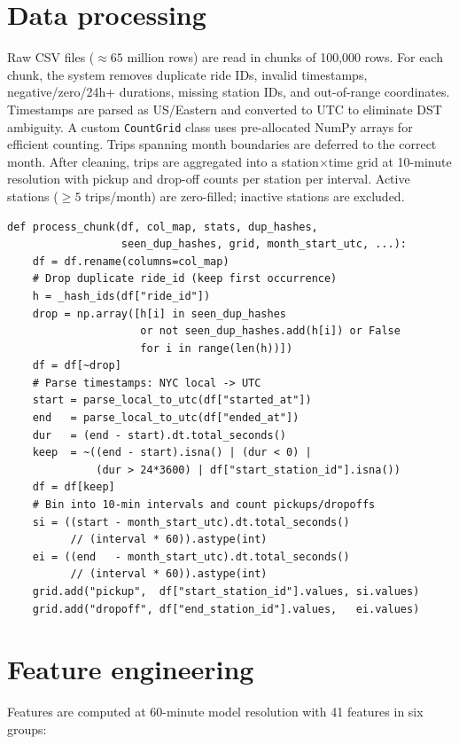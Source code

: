 \documentclass[12pt,a4paper]{report}
\begin{document}
\section{Data processing}

Raw CSV files ($\approx 65$ million rows) are read in chunks of
100{,}000 rows. For each chunk, the system removes duplicate ride
IDs, invalid timestamps, negative/zero/24h+ durations, missing
station IDs, and out-of-range coordinates. Timestamps are parsed as
US/Eastern and converted to UTC to eliminate DST ambiguity. A custom
\texttt{CountGrid} class uses pre-allocated NumPy arrays for efficient
counting. Trips spanning month boundaries are deferred to the correct
month. After cleaning, trips are aggregated into a
station$\times$time grid at 10-minute resolution with pickup and
drop-off counts per station per interval. Active stations
($\geq 5$ trips/month) are zero-filled; inactive stations are
excluded.

\begin{lstlisting}[caption={Data cleaning and aggregation
(chunk processing, \texttt{preprocess.py})},label={lst:clean}]
def process_chunk(df, col_map, stats, dup_hashes,
                  seen_dup_hashes, grid, month_start_utc, ...):
    df = df.rename(columns=col_map)
    # Drop duplicate ride_id (keep first occurrence)
    h = _hash_ids(df["ride_id"])
    drop = np.array([h[i] in seen_dup_hashes
                     or not seen_dup_hashes.add(h[i]) or False
                     for i in range(len(h))])
    df = df[~drop]
    # Parse timestamps: NYC local -> UTC
    start = parse_local_to_utc(df["started_at"])
    end   = parse_local_to_utc(df["ended_at"])
    dur   = (end - start).dt.total_seconds()
    keep  = ~((end - start).isna() | (dur < 0) |
              (dur > 24*3600) | df["start_station_id"].isna())
    df = df[keep]
    # Bin into 10-min intervals and count pickups/dropoffs
    si = ((start - month_start_utc).dt.total_seconds()
          // (interval * 60)).astype(int)
    ei = ((end   - month_start_utc).dt.total_seconds()
          // (interval * 60)).astype(int)
    grid.add("pickup",  df["start_station_id"].values, si.values)
    grid.add("dropoff", df["end_station_id"].values,   ei.values)
\end{lstlisting}

\section{Feature engineering}

Features are computed at 60-minute model resolution with 41 features
in six groups:
\end{document}

